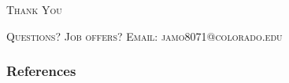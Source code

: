 \documentclass{cubeamer}
\begin{document}




\begin{frame}[standout]
    \Huge\textsc{Thank You}

    \vfill
    
    \LARGE\textsc{Questions? Job offers?}
    \textsc{Email: jamo8071@colorado.edu}
\end{frame}

\begin{frame}[allowframebreaks]
    \frametitle{References}
    \printbibliography[heading=none]
\end{frame}


%  
\end{document}
